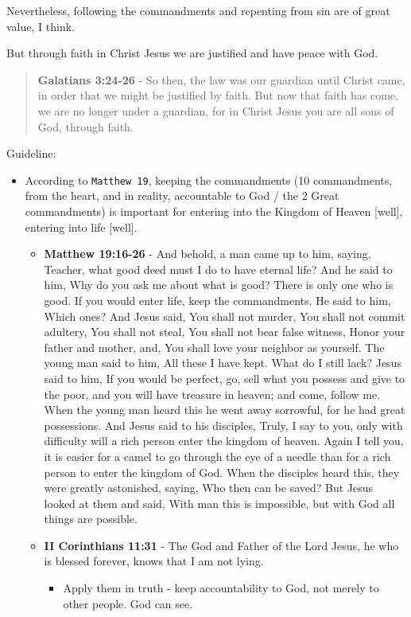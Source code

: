 \documentclass[11pt]{article}
\begin{document}
Nevertheless, following the commandments and repenting from sin are of great value, I think.

But through faith in Christ Jesus we are justified and have peace with God.

\begin{quote}
\textbf{Galatians 3:24-26} - So then, the law was our guardian until Christ came, in order that we might be justified by faith. But now that faith has come, we are no longer under a guardian, for in Christ Jesus you are all sons of God, through faith.
\end{quote}

Guideline:
\begin{itemize}
\item According to \texttt{Matthew 19}, keeping the commandments (10 commandments, from the heart, and in reality, accountable to God / the 2 Great commandments) is important for entering into the Kingdom of Heaven [well], entering into life [well].
\begin{itemize}
\item \textbf{Matthew 19:16-26} - And behold, a man came up to him, saying, Teacher, what good deed must I do to have eternal life? And he said to him, Why do you ask me about what is good? There is only one who is good. If you would enter life, keep the commandments. He said to him, Which ones? And Jesus said, You shall not murder, You shall not commit adultery, You shall not steal, You shall not bear false witness, Honor your father and mother, and, You shall love your neighbor as yourself. The young man said to him, All these I have kept. What do I still lack? Jesus said to him, If you would be perfect, go, sell what you possess and give to the poor, and you will have treasure in heaven; and come, follow me. When the young man heard this he went away sorrowful, for he had great possessions. And Jesus said to his disciples, Truly, I say to you, only with difficulty will a rich person enter the kingdom of heaven. Again I tell you, it is easier for a camel to go through the eye of a needle than for a rich person to enter the kingdom of God. When the disciples heard this, they were greatly astonished, saying, Who then can be saved? But Jesus looked at them and said, With man this is impossible, but with God all things are possible.
\item \textbf{II Corinthians 11:31} - The God and Father of the Lord Jesus, he who is blessed forever, knows that I am not lying.
\begin{itemize}
\item Apply them in truth - keep accountability to God, not merely to other people. God can see.

\end{itemize}
\end{itemize}
\end{itemize}
\end{document}
